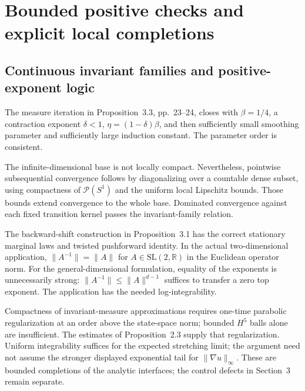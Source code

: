\documentclass[10pt]{article}
\begin{document}
\section*{Bounded positive checks and explicit local completions}
\subsection*{Continuous invariant families and positive-exponent logic}
The measure iteration in Proposition 3.3, pp. 23–24, closes with \(\beta=1/4\), a contraction exponent \(\delta<1\), \(\eta=(1-\delta)\beta\), and then sufficiently small smoothing parameter and sufficiently large induction constant. The parameter order is consistent.\par
The infinite-dimensional base is not locally compact. Nevertheless, pointwise subsequential convergence follows by diagonalizing over a countable dense subset, using compactness of \(\mathcal P(S^1)\) and the uniform local Lipschitz bounds. Those bounds extend convergence to the whole base. Dominated convergence against each fixed transition kernel passes the invariant-family relation.\par
The backward-shift construction in Proposition 3.1 has the correct stationary marginal laws and twisted pushforward identity. In the actual two-dimensional application, \(\|A^{-1}\|=\|A\|\) for \(A\in\mathrm{SL}(2,\mathbb R)\) in the Euclidean operator norm. For the general-dimensional formulation, equality of the exponents is unnecessarily strong: \(\|A^{-1}\|\le\|A\|^{d-1}\) suffices to transfer a zero top exponent. The application has the needed log-integrability.\par
Compactness of invariant-measure approximations requires one-time parabolic regularization at an order above the state-space norm; bounded \(H^5\) balls alone are insufficient. The estimates of Proposition 2.3 supply that regularization. Uniform integrability suffices for the expected stretching limit; the argument need not assume the stronger displayed exponential tail for \(\|\nabla u\|_\infty\). These are bounded completions of the analytic interfaces; the control defects in Section 3 remain separate.\par
\end{document}
